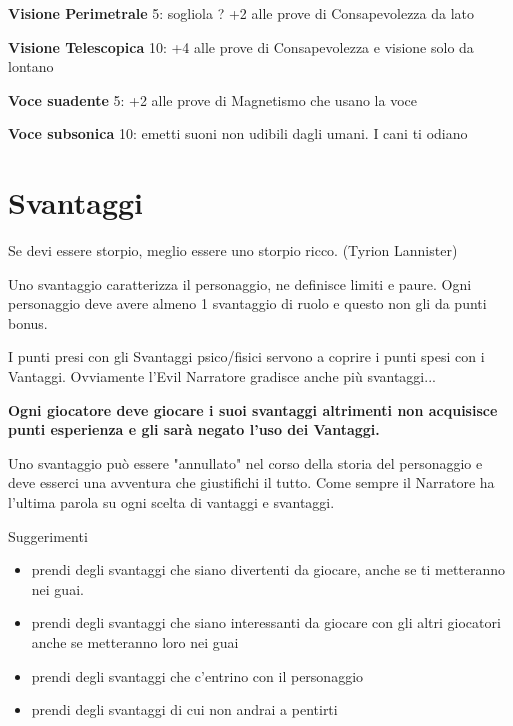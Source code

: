 \documentclass[a4paper,11pt,twoside,openany]{book}
\begin{document}
\textbf{Visione Perimetrale} 5: sogliola ? +2 alle prove di Consapevolezza da lato

\textbf{Visione Telescopica} 10: +4 alle prove di Consapevolezza e visione solo da lontano

\textbf{Voce suadente} 5: +2 alle prove di Magnetismo che usano la voce

\textbf{Voce subsonica} 10: emetti suoni non udibili dagli umani. I cani ti odiano

\pagebreak

\section{Svantaggi}

\label{svantaggi}
\begin{tcolorbox}[enhanced,arc=5pt,boxrule=0.3pt]{Se devi essere storpio, meglio essere uno storpio ricco. (Tyrion Lannister)}\end{tcolorbox}\medskip

Uno svantaggio caratterizza il personaggio, ne definisce limiti e paure. Ogni personaggio deve avere almeno 1 svantaggio di ruolo e questo non gli da punti bonus.

I punti presi con gli Svantaggi psico/fisici servono a coprire i punti spesi con i Vantaggi. Ovviamente l'Evil Narratore gradisce anche più svantaggi...

\textbf{Ogni giocatore deve giocare i suoi svantaggi altrimenti non acquisisce punti esperienza e gli sarà negato l'uso dei Vantaggi.}

Uno svantaggio può essere "annullato" nel corso della storia del personaggio e deve esserci una avventura che giustifichi il tutto. Come sempre il Narratore ha l'ultima parola su ogni scelta di vantaggi e svantaggi.

\bigskip

Suggerimenti
\begin{itemize}
	\item
	      prendi degli svantaggi che siano divertenti da giocare, anche se ti metteranno nei guai.
	\item
	      prendi degli svantaggi che siano interessanti da giocare con gli altri giocatori anche se metteranno loro nei guai
	\item
	      prendi degli svantaggi che c'entrino con il personaggio
	\item
	      prendi degli svantaggi di cui non andrai a pentirti
\end{itemize}
\end{document}
